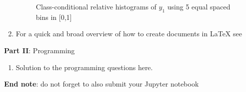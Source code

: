 \documentclass[12pt]{article}
\begin{document}
\begin{enumerate}
\begin{figure}[ht]
    \begin{minipage}[t]{0.48\linewidth}
        \centering
    \end{minipage}
    
    \caption{Class-conditional relative histograms of $y_1$ using 5 equal spaced bins in [0,1]}
\end{figure}

\vspace{10cm}

\item For a quick and broad overview of how to create documents in {\LaTeX} see 
\end{enumerate}

\newpage

\large{\textbf{Part II}: Programming}\normalsize

\begin{enumerate}[leftmargin=\labelsep,resume]
\item Solution to the programming questions here.
\end{enumerate}     
\vskip 1cm
\textbf{End note}: do not forget to also submit your Jupyter notebook
\end{document}
